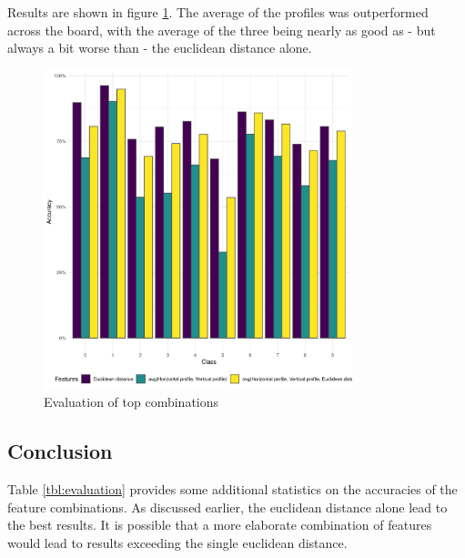 \documentclass[a4paper]{scrreprt}
\begin{document}
Results are shown in figure \ref{fig:evaluation_top}. The average of the
profiles was outperformed across the board, with the average of the three being
nearly as good as - but always a bit worse than - the euclidean distance alone.

\begin{figure}[h]
        \centering
		\includegraphics[width=0.8\textwidth]{resources/features_top.png}
		\caption{Evaluation of top combinations}
		\label{fig:evaluation_top}
\end{figure}

\subsection{Conclusion}

Table \ref{tbl:evaluation} provides some additional statistics on the
accuracies of the feature combinations. As discussed earlier, the euclidean
distance alone lead to the best results. It is possible that a more elaborate
combination of features would lead to results exceeding the single euclidean
distance.
\end{document}
